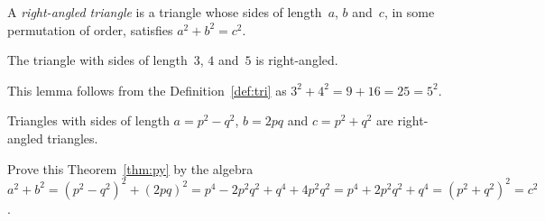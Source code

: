 \documentclass[12pt,a4paper]{extarticle}
\begin{document}
\begin{definition} \label{def:tri}
A \emph{right-angled triangle} is a triangle whose sides of length~\(a\), \(b\) and~\(c\), in some permutation 
of order, satisfies \(a^2+b^2=c^2\).
\end{definition}

\begin{lemma} 
The triangle with sides of length~\(3\), \(4\) and~\(5\) is right-angled.
\end{lemma}

This lemma follows from the Definition~\ref{def:tri} as \(3^2+4^2=9+16=25=5^2\).

\begin{theorem} \label{thm:py}
Triangles with sides of length \(a=p^2-q^2\), \(b=2pq\) and \(c=p^2+q^2\) are right-angled triangles.
\end{theorem}

Prove this Theorem~\ref{thm:py} by the algebra \(a^2+b^2 =(p^2-q^2)^2+(2pq)^2
=p^4-2p^2q^2+q^4+4p^2q^2
=p^4+2p^2q^2+q^4
=(p^2+q^2)^2 =c^2\).
\end{document}
